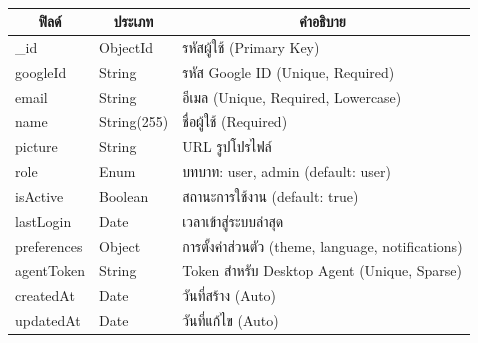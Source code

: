 \begin{table}[H]
    \caption{}
    \label{tab:user-structure}
    \fontSixTeen 
    \begin{tabularx}{\textwidth}{|l|l|X|} 
        \hline
        \multicolumn{1}{|c|}{\textbf{ฟิลด์}} & \multicolumn{1}{c|}{\textbf{ประเภท}} & \multicolumn{1}{c|}{\textbf{คำอธิบาย}} \\
        \hline
        \_id & ObjectId & รหัสผู้ใช้ (Primary Key) \\
        \hline
        googleId & String & รหัส Google ID (Unique, Required) \\
        \hline
        email & String & อีเมล (Unique, Required, Lowercase) \\
        \hline
        name & String(255) & ชื่อผู้ใช้ (Required) \\
        \hline
        picture & String & URL รูปโปรไฟล์ \\
        \hline
        role & Enum & บทบาท: user, admin (default: user) \\
        \hline
        isActive & Boolean & สถานะการใช้งาน (default: true) \\
        \hline
        lastLogin & Date & เวลาเข้าสู่ระบบล่าสุด \\
        \hline
        preferences & Object & การตั้งค่าส่วนตัว (theme, language, notifications) \\
        \hline
        agentToken & String & Token สำหรับ Desktop Agent (Unique, Sparse) \\
        \hline
        createdAt & Date & วันที่สร้าง (Auto) \\
        \hline
        updatedAt & Date & วันที่แก้ไข (Auto) \\
        \hline
    \end{tabularx}
\end{table}


